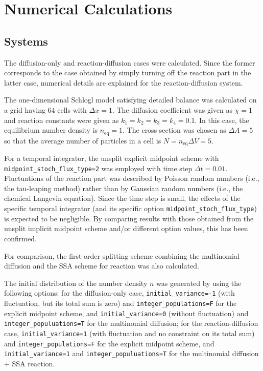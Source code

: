 \documentclass{article}
\begin{document}
\section{Numerical Calculations}

\subsection{Systems}

The diffusion-only and reaction-diffusion cases were calculated.
Since the former corresponds to the case obtained by simply turning off the reaction part in the latter case, numerical details are explained for the reaction-diffusion system.

The one-dimensional Schlogl model satisfying detailed balance was calculated on a grid having 64 cells with $\Delta x=1$.
The diffusion coefficient was given as $\chi=1$ and reaction constants were given as $k_1=k_2=k_3=k_4=0.1$.
In this case, the equilibrium number density is $n_\mathrm{eq}=1$.
The cross section was chosen as $\Delta A=5$ so that the average number of particles in a cell is $N=n_\mathrm{eq}\Delta V=5$.

For a temporal integrator, the unsplit explicit midpoint scheme with \texttt{midpoint\_stoch\_flux\_type=2} was employed with time step $\Delta t=0.01$.
Fluctuations of the reaction part was described by Poisson random numbers (i.e., the tau-leaping method) rather than by Gaussian random numbers (i.e., the chemical Langevin equation). 
Since the time step is small, the effects of the specific temporal integrator (and its specific option \texttt{midpoint\_stoch\_flux\_type}) is expected to be negligible.
By comparing results with those obtained from the unsplit implicit midpoint scheme and/or different option values, this has been confirmed. 

For comparison, the first-order splitting scheme combining the multinomial diffusion and the SSA scheme for reaction was also calculated.

The initial distribution of the number density $n$ was generated by using the following options: for the diffusion-only case, \texttt{initial\_variance=-1} (with fluctuation, but its total sum is zero) and \texttt{integer\_populations=F} for the explicit midpoint scheme, and \texttt{initial\_variance=0} (without fluctuation) and \texttt{integer\_populuations=T} for the multinomial diffusion; for the reaction-diffusion case, \texttt{initial\_variance=1} (with fluctuation and no constraint on its total sum) and \texttt{integer\_populations=F} for the explicit midpoint scheme, and \texttt{initial\_variance=1} and \texttt{integer\_populuations=T} for the multinomial diffusion + SSA reaction.
\end{document}
